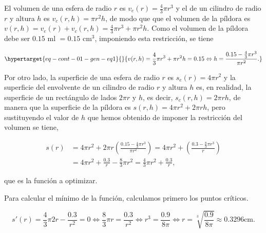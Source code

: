 \documentclass[
  a4paper,
]{scrreport}
\theoremstyle{definition}
\theoremstyle{remark}
\begin{document}
\begin{tcolorbox}[enhanced jigsaw, colframe=quarto-callout-tip-color-frame, opacitybacktitle=0.6, colbacktitle=quarto-callout-tip-color!10!white, rightrule=.15mm, toptitle=1mm, opacityback=0, title=\textcolor{quarto-callout-tip-color}{\faLightbulb}\hspace{0.5em}{Solución}, arc=.35mm, toprule=.15mm, breakable, bottomtitle=1mm, titlerule=0mm, bottomrule=.15mm, leftrule=.75mm, coltitle=black, left=2mm, colback=white]

El volumen de una esfera de radio \(r\) es \(v_e(r)=\frac{4}{3}\pi r^3\)
y el de un cilindro de radio \(r\) y altura \(h\) es
\(v_c(r,h)=\pi r^2 h\), de modo que que el volumen de la píldora es
\(v(r,h)=v_e(r)+v_c(r,h) = \frac{4}{3}\pi r^3 + \pi r^2 h\). Como el
volumen de la píldora debe ser \(0.15\) ml \(=0.15\) cm\(^3\),
imponiendo esta restricción, se tiene

\begin{equation}\protect\hypertarget{eq-cont-01-gen-eq1}{}{
v(r,h)=\frac{4}{3}\pi r^3 + \pi r^2 h = 0.15 \Leftrightarrow h = \frac{0.15-\frac{4}{3}\pi r^3}{\pi r^2}.
}\label{eq-cont-01-gen-eq1}\end{equation}

Por otro lado, la superficie de una esfera de radio \(r\) es
\(s_e(r)=4\pi r^2\) y la superficie del envolvente de un cilindro de
radio \(r\) y altura \(h\) es, en realidad, la superficie de un
rectángulo de lados \(2\pi r\) y \(h\), es decir,
\(s_c(r,h) = 2\pi r h\), de manera que la superficie de la píldora es
\(s(r,h) = 4\pi r^2+2\pi r h\), pero sustituyendo el valor de \(h\) que
hemos obtenido de imponer la restricción del volumen se tiene,

\begin{align*}
s(r) &= 4\pi r^2 + 2\pi r \left(\frac{0.15-\frac{4}{3}\pi r^3}{\pi r^2}\right) = 4\pi r^2 + \left(\frac{0.3-\frac{8}{3}\pi r^3}{r}\right)\\ 
&= 4\pi r^2 + \frac{0.3}{r} - \frac{8}{3}\pi r^2 = \frac{4}{3}\pi r^2+ \frac{0.3}{r},
\end{align*}

que es la función a optimizar.

Para calcular el mínimo de la función, calculamos primero los puntos
críticos.

\[
s'(r) = \frac{4}{3}\pi 2r -\frac{0.3}{r^2} =0 \Leftrightarrow \frac{8}{3}\pi r = \frac{0.3}{r^2} \Leftrightarrow r^3 = \frac{0.9}{8\pi} \Leftrightarrow r = \sqrt[3]{\frac{0.9}{8\pi}} \approx 0.3296 \mbox{cm}.
\]


\end{tcolorbox}
\end{document}

